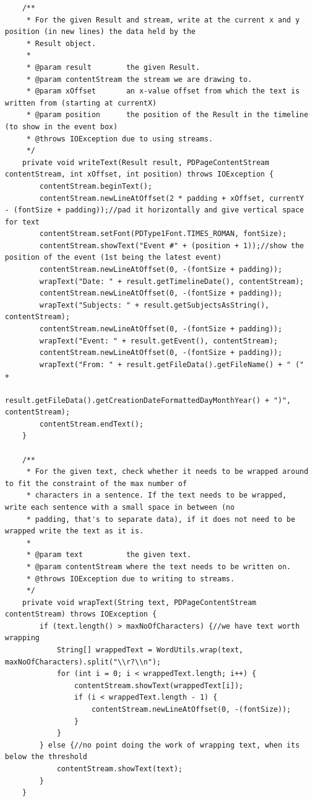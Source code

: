 \begin{lstlisting}
    /**
     * For the given Result and stream, write at the current x and y position (in new lines) the data held by the
     * Result object.
     *
     * @param result        the given Result.
     * @param contentStream the stream we are drawing to.
     * @param xOffset       an x-value offset from which the text is written from (starting at currentX)
     * @param position      the position of the Result in the timeline (to show in the event box)
     * @throws IOException due to using streams.
     */
    private void writeText(Result result, PDPageContentStream contentStream, int xOffset, int position) throws IOException {
        contentStream.beginText();
        contentStream.newLineAtOffset(2 * padding + xOffset, currentY - (fontSize + padding));//pad it horizontally and give vertical space for text
        contentStream.setFont(PDType1Font.TIMES_ROMAN, fontSize);
        contentStream.showText("Event #" + (position + 1));//show the position of the event (1st being the latest event)
        contentStream.newLineAtOffset(0, -(fontSize + padding));
        wrapText("Date: " + result.getTimelineDate(), contentStream);
        contentStream.newLineAtOffset(0, -(fontSize + padding));
        wrapText("Subjects: " + result.getSubjectsAsString(), contentStream);
        contentStream.newLineAtOffset(0, -(fontSize + padding));
        wrapText("Event: " + result.getEvent(), contentStream);
        contentStream.newLineAtOffset(0, -(fontSize + padding));
        wrapText("From: " + result.getFileData().getFileName() + " (" +
                result.getFileData().getCreationDateFormattedDayMonthYear() + ")", contentStream);
        contentStream.endText();
    }

    /**
     * For the given text, check whether it needs to be wrapped around to fit the constraint of the max number of
     * characters in a sentence. If the text needs to be wrapped, write each sentence with a small space in between (no
     * padding, that's to separate data), if it does not need to be wrapped write the text as it is.
     *
     * @param text          the given text.
     * @param contentStream where the text needs to be written on.
     * @throws IOException due to writing to streams.
     */
    private void wrapText(String text, PDPageContentStream contentStream) throws IOException {
        if (text.length() > maxNoOfCharacters) {//we have text worth wrapping
            String[] wrappedText = WordUtils.wrap(text, maxNoOfCharacters).split("\\r?\\n");
            for (int i = 0; i < wrappedText.length; i++) {
                contentStream.showText(wrappedText[i]);
                if (i < wrappedText.length - 1) {
                    contentStream.newLineAtOffset(0, -(fontSize));
                }
            }
        } else {//no point doing the work of wrapping text, when its below the threshold
            contentStream.showText(text);
        }
    }


\end{lstlisting}
